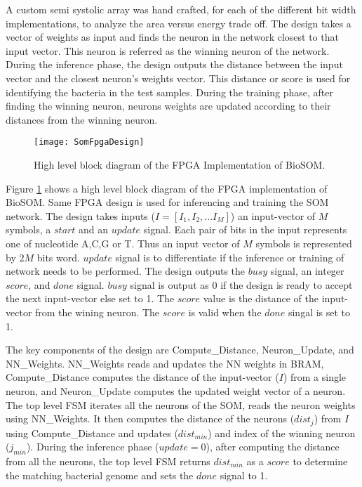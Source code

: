 A custom semi systolic array was hand crafted, for each of the different bit width implementations, to analyze the area versus energy trade off. The design takes a vector of weights as input and finds the neuron in the network closest to that input vector. This neuron is referred as the winning neuron of the network. During the inference phase, the design outputs the distance between the input vector and the closest neuron's weights vector. This distance or score is used for identifying the bacteria in the test samples. During the training phase, after finding the winning neuron, neurons weights are updated according to their distances from the winning neuron.
\begin{figure}[h]
	\centering
	\captionsetup{font=sf}
	\texttt{[image: SomFpgaDesign]}
	\caption{High level block diagram of the FPGA Implementation of BioSOM.}
	\label{fig:SOMFPGAImplementation}
\end{figure}

Figure \ref{fig:SOMFPGAImplementation} shows a high level block diagram of the FPGA implementation of BioSOM. Same FPGA design is used for inferencing and training the SOM network. The design takes inputs ($I{=}[I_1,I_2,...I_M]$) an input-vector of $M$ symbols, a $start$ and an $update$ signal. Each pair of bits in the input represents one of nucleotide A,C,G or T. Thus an input vector of $M$ symbols is represented by $2M$ bits word. $update$ signal is to differentiate if the inference or training of network needs to be performed. The design outputs the $busy$ signal, an integer $score$, and $done$ signal. $busy$ signal is output as 0 if the design is ready to accept the next input-vector else set to 1. The $score$ value is the distance of the input-vector from the wining neuron. The $score$ is valid when the $done$ singal is set to 1. 

The key components of the design are Compute\_Distance, Neuron\_Update, and NN\_Weights.
NN\_Weights reads and updates the NN weights in BRAM, Compute\_Distance computes the distance of the input-vector ($I$) from a single neuron, and Neuron\_Update computes the updated weight vector of a neuron.
The top level FSM iterates all the neurons of the SOM, reads the neuron weights using NN\_Weights. It then computes the distance of the neurons ($dist_j$) from $I$ using Compute\_Distance and updates ($dist_{min}$) and index of the winning neuron ($j_{min}$). During the inference phase ($update{=}0$), after computing the distance from all the neurons, the top level FSM returns $dist_{min}$ as a $score$ to determine the matching bacterial genome and sets the $done$ signal to 1. 

